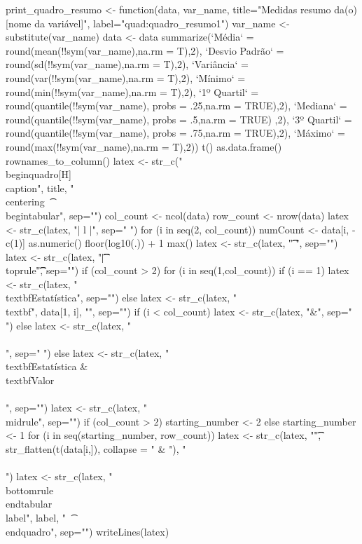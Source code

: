 \documentclass[
  letterpaper,
  DIV=11,
  numbers=noendperiod]{scrartcl}
\begin{document}
print_quadro_resumo <- function(data, var_name, title="Medidas resumo
da(o) [nome da variável]", label="quad:quadro_resumo1") {
  var_name <- substitute(var_name)
  data <- data %
    summarize(`Média` = round(mean(!!sym(var_name),na.rm = T),2),
              `Desvio Padrão` = round(sd(!!sym(var_name),na.rm = T),2),
              `Variância` = round(var(!!sym(var_name),na.rm = T),2),
              `Mínimo` = round(min(!!sym(var_name),na.rm = T),2),
              `1º Quartil` = round(quantile(!!sym(var_name), probs =
                                              .25,na.rm = TRUE),2),
              `Mediana` = round(quantile(!!sym(var_name), probs = .5,na.rm = TRUE)
                                ,2),
              `3º Quartil` = round(quantile(!!sym(var_name), probs =
                                              .75,na.rm = TRUE),2),
              `Máximo` = round(max(!!sym(var_name),na.rm = T),2)) %
    t() %
    as.data.frame() %
    rownames_to_column()
  latex <- str_c("\\begin{quadro}[H]
\t\\caption{", title, "}
\t\\centering
\t\\begin{adjustbox}{max width=\\textwidth}
\t\\begin{tabular}{", sep="")
  col_count <- ncol(data)
  row_count <- nrow(data)
  latex <- str_c(latex, "| l |\n", sep=" ")
  for (i in seq(2, col_count))
  {
    numCount <- data[i, -c(1)] %
      as.numeric() %
      {floor(log10(.)) + 1} %
      max()
    latex <- str_c(latex, "\t\t\tS[table-format = ", numCount ,".2]\n
", sep="")
  }
  latex <- str_c(latex, "\t\t\t|}\n\t\\toprule\n\t\t", sep="")
  if (col_count > 2)
  {
    for (i in seq(1,col_count))
    {
      if (i == 1)
        latex <- str_c(latex, "\\textbf{Estatística}", sep="")
      else
        latex <- str_c(latex, " \\textbf{", data[1, i], "}", sep="")
      if (i < col_count)
        latex <- str_c(latex, "&", sep=" ")
      else
        latex <- str_c(latex, "\\\\\n", sep=" ")
    }
  }
  else
  {
    latex <- str_c(latex, "\\textbf{Estatística} & \\textbf{Valor}
\\\\\n", sep="")
  }
  latex <- str_c(latex, "\t\t\\midrule\n", sep="")
  if (col_count > 2)
    starting_number <- 2
  else
    starting_number <- 1
  for (i in seq(starting_number, row_count))
  {
    latex <- str_c(latex, "\t\t", str_flatten(t(data[i,]), collapse =
                                                " & "), " \\\\\n")
  }
  latex <- str_c(latex, "\t\\bottomrule
  \t\\end{tabular}
\t\\label{", label, "}
\t\\end{adjustbox}
\\end{quadro}", sep="")
  writeLines(latex)
}
\end{document}
